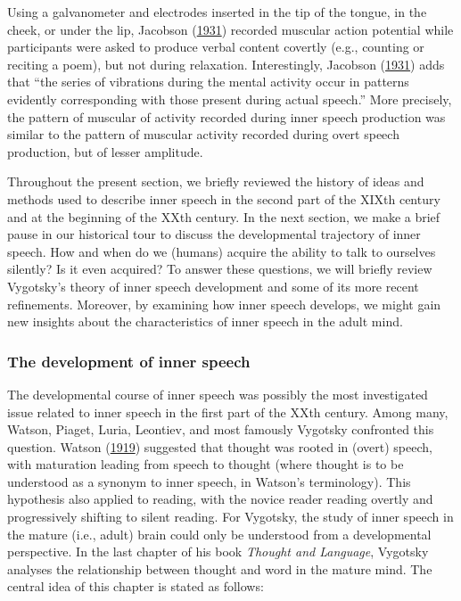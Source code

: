 \documentclass[a4paper,12pt,twoside,openright,oldfontcommands]{memoir}
\begin{document}
Using a galvanometer and electrodes inserted in the tip of the tongue, in the cheek, or under the lip, Jacobson (\protect\hyperlink{ref-jacobson_electrical_1931}{1931}) recorded muscular action potential while participants were asked to produce verbal content covertly (e.g., counting or reciting a poem), but not during relaxation. Interestingly, Jacobson (\protect\hyperlink{ref-jacobson_electrical_1931}{1931}) adds that \enquote{the series of vibrations during the mental activity occur in patterns evidently corresponding with those present during actual speech.} More precisely, the pattern of muscular of activity recorded during inner speech production was similar to the pattern of muscular activity recorded during overt speech production, but of lesser amplitude.

Throughout the present section, we briefly reviewed the history of ideas and methods used to describe inner speech in the second part of the XIXth century and at the beginning of the XXth century. In the next section, we make a brief pause in our historical tour to discuss the developmental trajectory of inner speech. How and when do we (humans) acquire the ability to talk to ourselves silently? Is it even acquired? To answer these questions, we will briefly review Vygotsky's theory of inner speech development and some of its more recent refinements. Moreover, by examining how inner speech develops, we might gain new insights about the characteristics of inner speech in the adult mind.

\hypertarget{the-development-of-inner-speech}{%
\subsubsection{The development of inner speech}\label{the-development-of-inner-speech}}

The developmental course of inner speech was possibly the most investigated issue related to inner speech in the first part of the XXth century. Among many, Watson, Piaget, Luria, Leontiev, and most famously Vygotsky confronted this question. Watson (\protect\hyperlink{ref-watson_psychology_1919}{1919}) suggested that thought was rooted in (overt) speech, with maturation leading from speech to thought (where thought is to be understood as a synonym to inner speech, in Watson's terminology). This hypothesis also applied to reading, with the novice reader reading overtly and progressively shifting to silent reading. For Vygotsky, the study of inner speech in the mature (i.e., adult) brain could only be understood from a developmental perspective. In the last chapter of his book \emph{Thought and Language}, Vygotsky analyses the relationship between thought and word in the mature mind. The central idea of this chapter is stated as follows:
\end{document}
